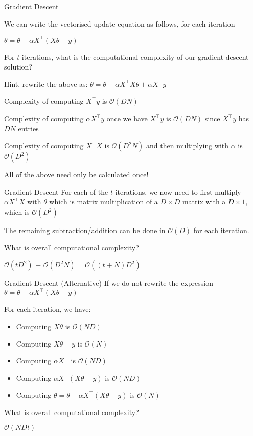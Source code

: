 \documentclass{beamer}
\begin{document}
\begin{frame}{Gradient Descent}


We can write the vectorised update equation as follows, for each iteration

\(\theta=\theta - \alpha X^{\top}(X \theta-y)\) 


\pause For $t$ iterations, what is the computational complexity of our gradient descent solution?

\pause Hint, rewrite the above as: \(\theta=\theta - \alpha X^{\top}X \theta+ \alpha X^{\top}y\) 

\pause Complexity of computing $X^{\top}y$ is $\mathcal{O}(DN)$

\pause Complexity of computing $\alpha X^{\top}y$ once we have $X^{\top}y$ is $\mathcal{O}(DN)$ since  $X^{\top}y$ has $DN$ entries

\pause Complexity of computing $X^{\top}X$ is $\mathcal{O}(D^2N)$ and then multiplying with $\alpha$ is  $\mathcal{O}(D^2)$

\pause All of the above need only be calculated once!



\end{frame}



\begin{frame}{Gradient Descent}
\pause For each of the $t$ iterations, we now need to first multiply  $\alpha X^{\top}X$ with $\theta$ which is matrix multiplication of a $D \times D$ matrix with a $D \times 1$, which is $\mathcal{O}(D^2)$ 

\pause The remaining subtraction/addition can be done in $\mathcal{O}(D)$ for each iteration.

\pause What is overall computational complexity?

\pause $\mathcal{O}(tD^2)$ + $\mathcal{O}(D^2N) = \mathcal{O}((t+N)D^2)$
\end{frame}

\begin{frame}{Gradient Descent (Alternative)}
\pause If we do not rewrite the expression
\(\theta=\theta - \alpha X^{\top}(X \theta-y)\) 

For each iteration, we have:
\begin{itemize}[<+->]
	\item Computing $X\theta$ is $\mathcal{O}(ND)$
	\item Computing $X\theta - y$ is $\mathcal{O}(N)$
	\item Computing $\alpha X^{\top}$ is $\mathcal{O}(ND)$
	\item Computing $\alpha X^{\top}(X\theta - y)$ is $\mathcal{O}(ND)$
	\item Computing \(\theta=\theta - \alpha X^{\top}(X \theta-y)\) is $\mathcal{O}(N)$
\end{itemize}

\pause What is overall computational complexity?

\pause $\mathcal{O}(NDt)$
\end{frame}
\end{document}
